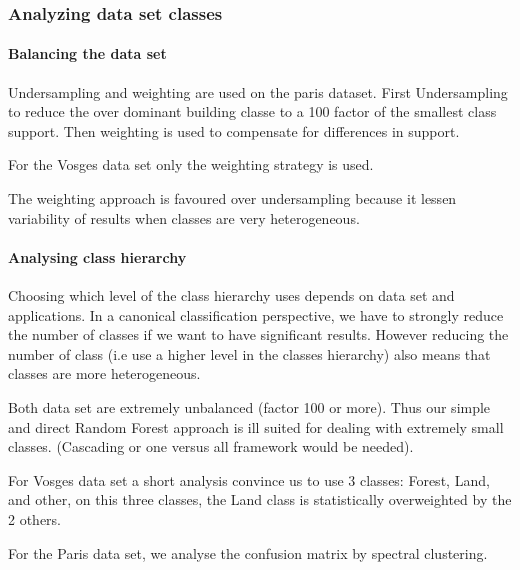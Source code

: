 		\subsubsection{Analyzing data set classes}
			\paragraph{Balancing the data set}  
				Undersampling and weighting are used on the paris dataset. First Undersampling to reduce the over dominant building classe to a 100 factor of the smallest class support. Then weighting is used to compensate for differences in support.
				
				For the Vosges data set only the weighting strategy is used.
				
				The weighting approach is favoured over undersampling because it lessen variability of results when classes are very heterogeneous.
				
				
			\paragraph{Analysing class hierarchy} 
				 
				Choosing which level of the class hierarchy uses depends on data set and applications.
				In a canonical classification perspective, we have to strongly reduce the number of classes if we want to have significant results.
				However reducing the number of class (i.e use a higher level in the classes hierarchy) also means that classes are more heterogeneous.
				
				Both data set are extremely unbalanced (factor 100 or more). Thus our simple and direct Random Forest approach is ill suited for dealing with extremely small classes. (Cascading or one versus all framework would be needed).
				
				For Vosges data set a short analysis convince us to use 3 classes: Forest, Land, and other, on this three classes, the Land class is statistically overweighted by the 2 others.	
				
				For the Paris data set, we analyse the confusion matrix by spectral clustering.
				
				
